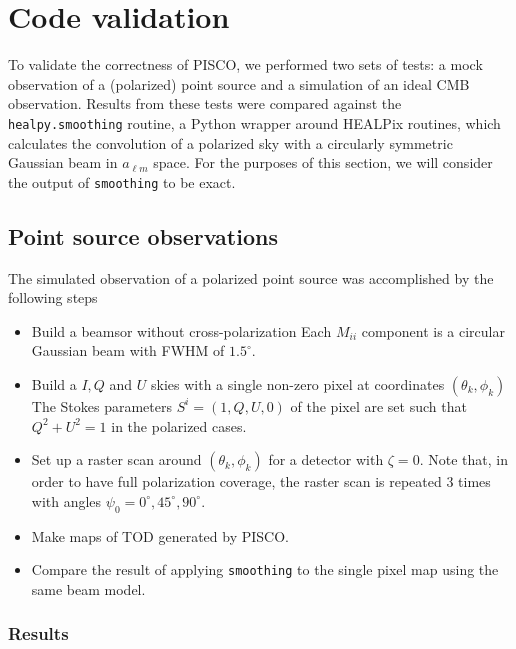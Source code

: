 \documentclass[a4paper,11pt]{article}
\begin{document}
%
\section{Code validation}
\label{sec::validation}

To validate the correctness of PISCO, we performed two sets of tests: a mock observation of a (polarized) point source and a simulation of an ideal CMB observation. Results from these tests were compared against the \texttt{healpy.smoothing} routine, a Python wrapper around HEALPix routines, which calculates the convolution of a polarized sky with a circularly symmetric Gaussian beam in $a_{\ell m}$ space. For the purposes of this section, we will consider the output of \texttt{smoothing} to be exact. 

\subsection{Point source observations}

The simulated observation of a polarized point source was accomplished by the following steps

\begin{itemize}
	\item Build a beamsor without cross-polarization Each $M_{ii}$ component is a circular Gaussian beam with FWHM of $1.5^\circ$.
	\item Build a $I,Q$ and $U$ skies with a single non-zero pixel at coordinates $(\theta_k,\phi_k)$ The Stokes parameters $S^{i} = (1,Q,U,0)$ of the pixel are set such that $Q^2 + U^2 = 1$ in the polarized cases.
	\item Set up a raster scan around $(\theta_k,\phi_k)$ for a detector with $\zeta=0$. Note that, in order to have full polarization coverage, the raster scan is repeated 3 times with angles $\psi_0 = 0^{\circ},45^{\circ},90^{\circ}$.
	\item Make maps of TOD generated by PISCO.
	\item Compare the result of applying \texttt{smoothing} to the single pixel map using the same beam model.
\end{itemize}

\subsubsection{Results}
\end{document}
